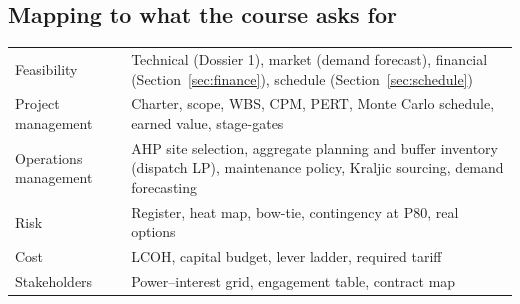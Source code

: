 \subsection{Mapping to what the course asks for}
\begin{center}\tablefont
\begin{tabularx}{\textwidth}{@{}P{38mm} L@{}}
\toprule
{} & \\ \midrule
Feasibility & Technical (Dossier 1), market (demand forecast), financial (Section~\ref{sec:finance}), schedule (Section~\ref{sec:schedule})\\
Project management & Charter, scope, WBS, CPM, PERT, Monte Carlo schedule, earned value, stage-gates\\
Operations management & AHP site selection, aggregate planning and buffer inventory (dispatch LP), maintenance policy, Kraljic sourcing, demand forecasting\\
Risk & Register, heat map, bow-tie, contingency at P80, real options\\
Cost & LCOH, capital budget, lever ladder, required tariff\\
Stakeholders & Power--interest grid, engagement table, contract map\\
\bottomrule
\end{tabularx}
\end{center}

